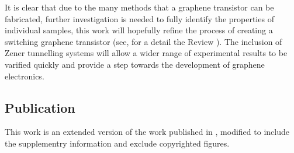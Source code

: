 \documentclass[prl,twocolumn,aps,superscriptaddress,floatfix,10pt]{revtex4}
\begin{document}
	It is clear that due to the many methods that a graphene transistor can be fabricated, further investigation is needed to fully identify the properties of individual samples, this work will hopefully refine the process of creating a switching graphene transistor (see, for a detail the Review \cite{b20}). The inclusion of Zener tunnelling systems will allow a wider range of experimental results to be varified quickly and provide a step towards the development of graphene electronics.

\subsection{Publication}
	This work is an extended version of the work published in \cite{r0}, modified to include the supplementry information and exclude copyrighted figures.
\end{document}
